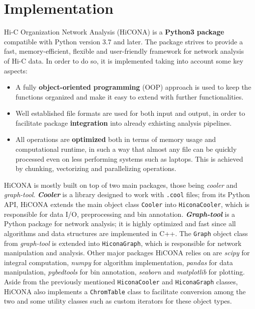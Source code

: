 \section{Implementation}
Hi-C Organization Network Analysis (HiCONA) is a \textbf{Python3 package} compatible with Python version 3.7 and later. The package strives to provide a fast, memory-efficient, flexible and user-friendly framework for network analysis of Hi-C data. In order to do so, it is implemented taking into account some key aspects:
\begin{itemize}\tightlist
  \item A fully \textbf{object-oriented programming} (OOP) approach is used to keep the functions organized and make it easy to extend with further functionalities.
  \item Well established file formats are used for both input and output, in order to facilitate package \textbf{integration} into already exhisting analysis pipelines.
  \item All operations are \textbf{optimized} both in terms of memory usage and computational runtime, in such a way that almost any file can be quickly processed even on less performing systems such as laptops. This is achieved by chunking, vectorizing and parallelizing operations.
\end{itemize}
HiCONA is mostly built on top of two main packages, those being \emph{cooler} and \emph{graph-tool}. \textbf{\emph{Cooler}} is a library designed to work with \texttt{.cool} files\cite{cooler2020}; from its Python API, HiCONA extends the main object class \texttt{Cooler} into \texttt{HiconaCooler}, which is responsible for data I/O, preprocessing and bin annotation. \textbf{\emph{Graph-tool}} is a Python package for network analysis\cite{graphtool2014}; it is highly optimized and fast since all algorithms and data structures are implemented in C++. The \texttt{Graph} object class from \emph{graph-tool} is extended into \texttt{HiconaGraph}, which is responsible for network manipulation and analysis. Other major packages HiCONA relies on are \emph{scipy}\cite{scipy2020} for integral computation, \emph{numpy}\cite{numpy2020} for algorithm implementation, \emph{pandas}\cite{pandas2020} for data manipulation, \emph{pybedtools}\cite{pybedtools2011} for bin annotation, \emph{seaborn}\cite{seaborn2021} and \emph{matplotlib}\cite{matplotlib2007} for plotting. Aside from the previously mentioned \texttt{HiconaCooler} and \texttt{HiconaGraph} classes, HiCONA also implements a \texttt{ChromTable} class to facilitate conversion among the two and some utility classes such as custom iterators for these object types.

